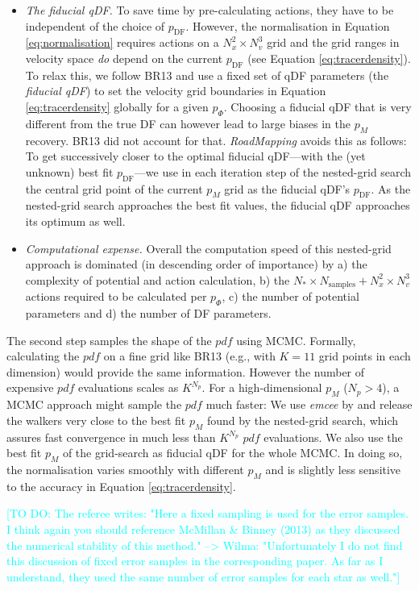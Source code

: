 \documentclass[iop,revtex4,numberedappendix,appendixfloats]{emulateapj}
\newcommand{\pdf}{\ensuremath{pdf}}
\newcommand{\pmodel}{\ensuremath{p_M}}
\newcommand{\RM}{{\sl RoadMapping}}
\newcommand{\HW}[1]{\textcolor{Cyan}{#1}}
\begin{document}
\begin{itemize}
\item \emph{The fiducial qDF.} To save time by pre-calculating actions, they have to be independent of the choice of $p_\text{DF}$. However, the normalisation in Equation \eqref{eq:normalisation} requires actions on a $N_x^2 \times N_v^3$ grid and the grid ranges in velocity space \emph{do} depend on the current $p_\text{DF}$ (see Equation \eqref{eq:tracerdensity}). To relax this, we follow BR13 and use a fixed set of qDF parameters (the \emph{fiducial qDF}) to set the velocity grid boundaries in Equation \eqref{eq:tracerdensity} globally for a given $p_\Phi$. Choosing a fiducial qDF that is very different from the true DF can however lead to large biases in the \pmodel{} recovery. BR13 did not account for that. \RM{} avoids this as follows: To get successively closer to the optimal fiducial qDF---with the (yet unknown) best fit $p_\text{DF}$---we use in each iteration step of the nested-grid search the central grid point of the current \pmodel{} grid as the fiducial qDF's $p_\text{DF}$.  As the nested-grid search approaches the best fit values, the fiducial qDF approaches its optimum as well. 

\item \emph{Computational expense.} Overall the computation speed of this nested-grid approach is dominated (in descending order of importance) by a) the complexity of potential and action calculation, b) the $N_* \times N_\text{samples} + N_x^2 \times N_v^3$ actions required to be calculated per $p_\Phi$, c) the number of potential parameters and d) the number of DF parameters.
\end{itemize}

The second step samples the shape of the \pdf{} using MCMC. Formally, calculating the \pdf{} on a fine grid like BR13 (e.g., with $K=11$ grid points in each dimension) would provide the same information. However the number of expensive \pdf{} evaluations scales as $K^{N_p}$. For a high-dimensional \pmodel{} ($N_p>4$), a MCMC approach might sample the \pdf{} much faster: We use \emph{emcee} by \citet{2013PASP..125..306F} and release the walkers very close to the best fit \pmodel{} found by the nested-grid search, which assures fast convergence in much less than $K^{N_p}$ \pdf{} evaluations. We also use the best fit \pmodel{} of the grid-search as fiducial qDF for the whole MCMC. In doing so, the normalisation varies smoothly with different $\pmodel{}$ and is slightly less sensitive to the accuracy in Equation \eqref{eq:tracerdensity}.

\HW{[TO DO: The referee writes: "Here a fixed sampling is used for the error samples. I think again you should reference McMillan \& Binney (2013) as they discussed the numerical stability of this method." --> Wilma: "Unfortunately I do not find this discussion of fixed error samples in the corresponding paper. As far as I understand, they used the same number of error samples for each star as well."]}
\end{document}
